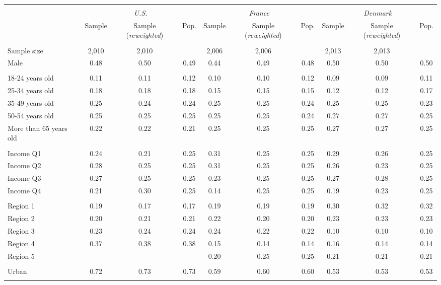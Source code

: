 \begin{tabular}{lccccccccc}
\toprule
\hline \\[-1.8ex]
\multicolumn{1}{c}{\em{ }} & \multicolumn{3}{c}{\em{U.S.}} & \multicolumn{3}{c}{\em{France}} & \multicolumn{3}{c}{\em{Denmark}}\\
\cmidrule(l{3pt}r{3pt}){2-4} \cmidrule(l{3pt}r{3pt}){5-7} \cmidrule(l{3pt}r{3pt}){8-10}
\noalign{\smallskip}  & Sample & Sample (\textit{reweighted}) & Pop. & Sample & Sample (\textit{reweighted}) & Pop. & Sample & Sample (\textit{reweighted}) & Pop. \\
\hline \\[-1.8ex] 
Sample size & 2,010 & 2,010 & & 2,006 & 2,006 &  & 2,013 & 2,013 & \\
\noalign{\smallskip}\hline \noalign{\smallskip}Male & 0.48 & 0.50 & 0.49 & 0.44 & 0.49 & 0.48 & 0.50 & 0.50 & 0.50\\ 
\\
18-24 years old & 0.11 & 0.11 & 0.12 & 0.10 & 0.10 & 0.12 & 0.09 & 0.09 & 0.11\\
25-34 years old & 0.18 & 0.18 & 0.18 & 0.15 & 0.15 & 0.15 & 0.12 & 0.12 & 0.17\\
35-49 years old & 0.25 & 0.24 & 0.24 & 0.25 & 0.25 & 0.24 & 0.25 & 0.25 & 0.23\\
50-54 years old & 0.25 & 0.25 & 0.25 & 0.25 & 0.25 & 0.24 & 0.27 & 0.27 & 0.25\\
More than 65 years old & 0.22 & 0.22 & 0.21 & 0.25 & 0.25 & 0.25 & 0.27 & 0.27 & 0.25\\ 
\\
Income Q1 & 0.24 & 0.21 & 0.25 & 0.31 & 0.25 & 0.25 & 0.29 & 0.26 & 0.25\\
Income Q2 & 0.28 & 0.25 & 0.25 & 0.31 & 0.25 & 0.25 & 0.26 & 0.23 & 0.25\\
Income Q3 & 0.27 & 0.25 & 0.25 & 0.23 & 0.25 & 0.25 & 0.27 & 0.28 & 0.25\\
Income Q4 & 0.21 & 0.30 & 0.25 & 0.14 & 0.25 & 0.25 & 0.19 & 0.23 & 0.25\\
\\
Region 1 & 0.19 & 0.17 & 0.17 & 0.19 & 0.19 & 0.19 & 0.30 & 0.32 & 0.32\\
Region 2 & 0.20 & 0.21 & 0.21 & 0.22 & 0.20 & 0.20 & 0.23 & 0.23 & 0.23\\
Region 3 & 0.23 & 0.24 & 0.24 & 0.24 & 0.22 & 0.22 & 0.10 & 0.10 & 0.10\\
Region 4 & 0.37 & 0.38 & 0.38 & 0.15 & 0.14 & 0.14 & 0.16 & 0.14 & 0.14\\
Region 5 & &  &  & 0.20 & 0.25 & 0.25 & 0.21 & 0.21 & 0.21\\
\\
Urban & 0.72 & 0.73 & 0.73 & 0.59 & 0.60 & 0.60 & 0.53 & 0.53 & 0.53\\
\\
\bottomrule
\end{tabular}